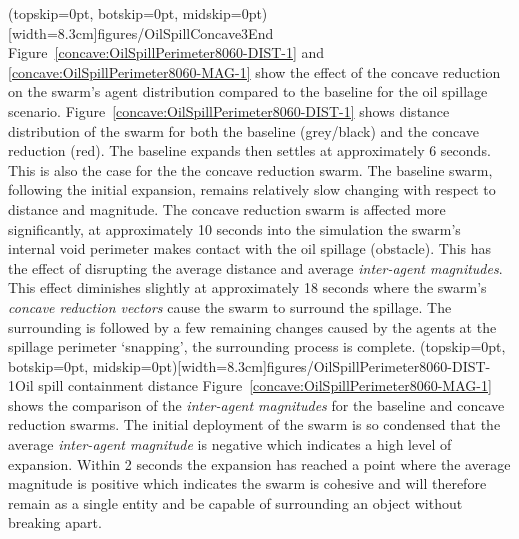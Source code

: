 \documentclass{ieeeaccess}
\begin{document}
\Figure[t!](topskip=0pt, botskip=0pt, midskip=0pt)[width=8.3cm]{figures/OilSpillConcave3}{End\label{concave:OilSpillConcave3}}
Figure~\ref{concave:OilSpillPerimeter8060-DIST-1} and \ref{concave:OilSpillPerimeter8060-MAG-1} show the effect of the concave reduction on the swarm's agent distribution compared to the baseline for the oil spillage scenario. 
Figure~\ref{concave:OilSpillPerimeter8060-DIST-1} shows distance distribution of the swarm for both the baseline (grey/black) and the concave reduction (red). The baseline expands then settles at approximately 6 seconds. This is also the case for the the concave reduction swarm. The baseline swarm, following the initial expansion, remains relatively slow changing with respect to distance and magnitude. The concave reduction swarm is affected more significantly, at approximately 10 seconds into the simulation the swarm's internal void perimeter makes contact with the oil spillage (obstacle). This has the effect of disrupting the average distance and average \textit{inter-agent magnitudes}. This effect diminishes slightly at approximately 18 seconds where the swarm's \textit{concave reduction vectors} cause the swarm to surround the spillage. The surrounding is followed by a few remaining changes caused by the agents at the spillage perimeter `snapping', the surrounding process is complete.
\Figure[t!](topskip=0pt, botskip=0pt, midskip=0pt)[width=8.3cm]{figures/OilSpillPerimeter8060-DIST-1}{Oil spill containment distance\label{concave:OilSpillPerimeter8060-DIST-1}}
Figure~\ref{concave:OilSpillPerimeter8060-MAG-1} shows the comparison of the \textit{inter-agent magnitudes} for the baseline and concave reduction swarms. The initial deployment of the swarm is so condensed that the average \textit{inter-agent magnitude} is negative which indicates a high level of expansion. Within 2 seconds the expansion has reached a point where the average magnitude is positive which indicates the swarm is cohesive and will therefore remain as a single entity and be capable of surrounding an object without breaking apart.
\end{document}
